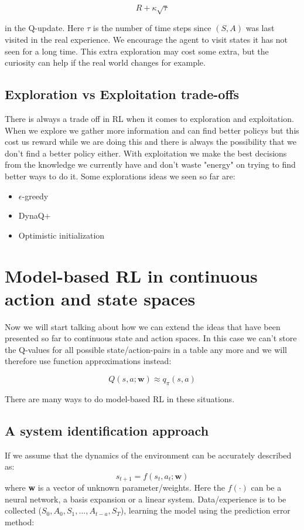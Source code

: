 	\begin{equation}
		R + \kappa \sqrt{\tau}
	\end{equation}

in the Q-update. Here $\tau$ is the number of time steps since $(S,A)$ was last visited in the real experience. We encourage the agent to visit states it has not seen for a long time. This extra exploration may cost some extra, but the curiosity can help if the real world changes for example.

\subsection*{Exploration vs Exploitation trade-offs}
There is always a trade off in RL when it comes to exploration and exploitation. When we explore we gather more information and can find better policys but this cost us reward while we are doing this and there is always the possibility that we don't find a better policy either. With exploitation we make the best decisions from the knowledge we currently have and don't waste "energy" on trying to find better ways to do it. Some explorations ideas we seen so far are:

\begin{itemize}
	\item $\epsilon$-greedy
	\item  DynaQ+
	\item Optimistic initialization
\end{itemize}

\section{Model-based RL in continuous action and state spaces}
Now we will start talking about how we can extend the ideas that have been presented so far to continuous state and action spaces. In this case we can't store the Q-values for all possible state/action-pairs in a table any more and we will therefore use function approximations instead:

	\begin{equation}
	 	Q(s,a;\textbf{w}) \approx q_\pi(s,a)
	 \end{equation} 

There are many ways to do model-based RL in these situations. 

\subsection*{A system identification approach}
If we assume that the dynamics of the environment can be accurately described as: 
	\begin{equation}
		s_{t+1} = f(s_t, a_t;\textbf{w})
	\end{equation}
where \textbf{w} is a vector of unknown parameter/weights. Here the $f(\cdot)$ can be a neural network, a basis expansion or a linear system. Data/experience is to be collected ($S_0,A_0,S_1,\ldots,A_{t-a},S_T$), learning the model using the prediction error method:

